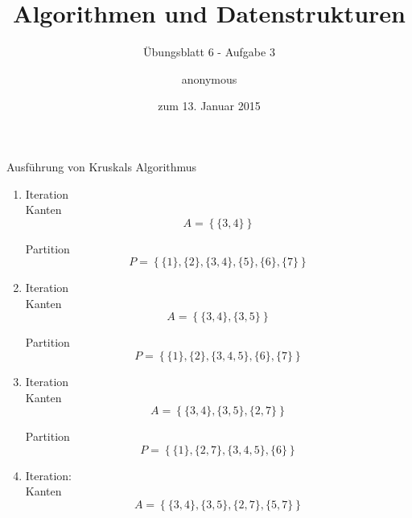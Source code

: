 \documentclass[a4paper]{scrartcl}
\title{Algorithmen und Datenstrukturen}
\subtitle{Übungsblatt 6 - Aufgabe 3}
\author{
    anonymous
}
\date{zum 13. Januar 2015}
\begin{document}
\maketitle

Ausführung von Kruskals Algorithmus
\begin{enumerate}
    \item Iteration \\
        Kanten
        \begin{equation}
            A = \left\{
                \{ 3,4 \}
            \right\}
        \end{equation}
        
        Partition
        \begin{equation}
            P = \left\{
                \{ 1 \},
                \{ 2 \},
                \{ 3,4 \},
                \{ 5 \},
                \{ 6 \},
                \{ 7 \}
            \right\}
        \end{equation}
        
    \item Iteration \\
        Kanten
        \begin{equation}
            A = \left\{
                \{ 3,4 \},
                \{ 3,5 \}
            \right\}
        \end{equation}
        
        Partition
        \begin{equation}
            P = \left\{
                \{ 1 \},
                \{ 2 \},
                \{ 3, 4, 5 \},
                \{ 6 \},
                \{ 7 \}
            \right\}
        \end{equation}
        
    \item Iteration \\
        Kanten
        \begin{equation}
            A = \left\{
                \{ 3,4 \},
                \{ 3,5 \},
                \{ 2,7 \}
            \right\}
        \end{equation}
        
        Partition
        \begin{equation}
            P = \left\{
                \{ 1 \},
                \{ 2, 7 \},
                \{ 3, 4, 5 \},
                \{ 6 \}
            \right\}
        \end{equation}
        
    \item Iteration:\\
        Kanten
        \begin{equation}
            A = \left\{
                \{ 3,4 \},
                \{ 3,5 \},
                \{ 2,7 \},
                \{ 5,7 \}
            \right\}
        \end{equation}
        

\end{enumerate}
\end{document}
